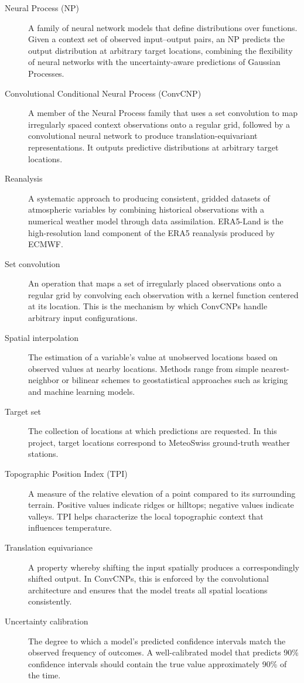 \begin{description}
    \item[Neural Process (NP)] A family of neural network models that define distributions over functions. Given a context set of observed input--output pairs, an NP predicts the output distribution at arbitrary target locations, combining the flexibility of neural networks with the uncertainty-aware predictions of Gaussian Processes.

    \item[Convolutional Conditional Neural Process (ConvCNP)] A member of the Neural Process family that uses a set convolution to map irregularly spaced context observations onto a regular grid, followed by a convolutional neural network to produce translation-equivariant representations. It outputs predictive distributions at arbitrary target locations.

    \item[Reanalysis] A systematic approach to producing consistent, gridded datasets of atmospheric variables by combining historical observations with a numerical weather model through data assimilation. ERA5-Land is the high-resolution land component of the ERA5 reanalysis produced by ECMWF.

    \item[Set convolution] An operation that maps a set of irregularly placed observations onto a regular grid by convolving each observation with a kernel function centered at its location. This is the mechanism by which ConvCNPs handle arbitrary input configurations.

    \item[Spatial interpolation] The estimation of a variable's value at unobserved locations based on observed values at nearby locations. Methods range from simple nearest-neighbor or bilinear schemes to geostatistical approaches such as kriging and machine learning models.

    \item[Target set] The collection of locations at which predictions are requested. In this project, target locations correspond to MeteoSwiss ground-truth weather stations.

    \item[Topographic Position Index (TPI)] A measure of the relative elevation of a point compared to its surrounding terrain. Positive values indicate ridges or hilltops; negative values indicate valleys. TPI helps characterize the local topographic context that influences temperature.

    \item[Translation equivariance] A property whereby shifting the input spatially produces a correspondingly shifted output. In ConvCNPs, this is enforced by the convolutional architecture and ensures that the model treats all spatial locations consistently.

    \item[Uncertainty calibration] The degree to which a model's predicted confidence intervals match the observed frequency of outcomes. A well-calibrated model that predicts 90\% confidence intervals should contain the true value approximately 90\% of the time.

\end{description}